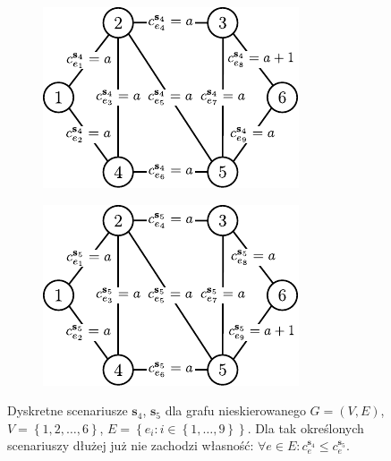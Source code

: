 \begin{figure}[!htbp]
	\null\hfill
	\begin{subfigure}[b]{0.3\textwidth}
		\includegraphics[width=\textwidth]{Chapter_II/MIN-MAX-DESC2-example/a}
		\caption{}
		\label{fig:minmaxexample:a}
	\end{subfigure}
	\hfill
	\begin{subfigure}[b]{0.3\textwidth}
		\includegraphics[width=\textwidth]{Chapter_II/MIN-MAX-DESC2-example/b}
		\caption{}
		\label{fig:minmaxexample:b}
	\end{subfigure}
	\hfill\null
	\caption{
		Dyskretne scenariusze $\textbf{s}_{4}$, $\textbf{s}_{5}$ dla grafu nieskierowanego $G = \left( V, E \right)$, $V = \left\{ 1, 2, \dots, 6 \right\}$, $E = \left\{ e_{i} : i \in \left\{ 1, \dots, 9 \right\} \right\}$.
		Dla tak określonych scenariuszy dłużej już nie zachodzi własność: $\forall e \in E : c^{\textbf{s}_{4}}_{e} \leqslant c^{\textbf{s}_{5}}_{e}$.
	}
	\label{fig:minmaxexample}
\end{figure}

